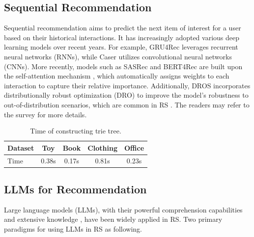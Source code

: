 \documentclass[sigconf,natbib=true]{acmart}
\begin{document}
\subsection{Sequential Recommendation}
Sequential recommendation aims to predict the next item of interest for a user based on their historical interactions. 
It has increasingly adopted various deep learning models over recent years. For example, GRU4Rec \cite{hidasi2015session} leverages recurrent neural networks (RNNs), while Caser \cite{tang2018personalized} utilizes convolutional neural networks (CNNs). More recently, models such as SASRec \cite{kang2018self} and BERT4Rec \cite{sun2019bert4rec} are built upon the self-attention mechanism \cite{vaswani2017attention, chen2024sigformer}, which automatically assigns weights to each interaction to capture their relative importance. Additionally, DROS \cite{yang2023generic} incorporates distributionally robust optimization (DRO) \cite{rahimian2019distributionally, wu2023understanding} to improve the model's robustness to out-of-distribution scenarios, which are common in RS \cite{wang2024distributionally, lin2024recommendation, chen2021autodebias, zhao2022popularity, gao2023alleviating, gao2023cirs}. The readers may refer to the survey \cite{fang2020deep,wang2019sequential} for more details.

\begin{table}[t]
\centering
\caption{Time of constructing trie tree.}
\label{tab:time_trie}
{%
\begin{tabular}{@{}lcccc@{}}
\toprule
Dataset                          & Toy   & Book  & Clothing & Office \\ \midrule
Time & 0.38s & 0.17s & 0.81s    & 0.23s  \\ \bottomrule
\end{tabular}%
}
\end{table}

\subsection{LLMs for Recommendation}
Large language models (LLMs), with their powerful comprehension capabilities and extensive knowledge \cite{dubey2024llama, achiam2023gpt, wang2024llm4dsr}, have been widely applied in RS. 
Two primary paradigms for using LLMs in RS as following.
\end{document}
